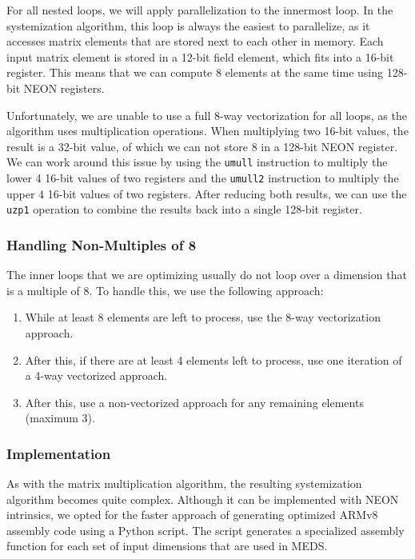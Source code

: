 \documentclass[11pt,a4paper]{report}
\theoremstyle{definition}
\begin{document}
For all nested loops, we will apply parallelization to the innermost loop. In the systemization algorithm, this loop is always the easiest to parallelize, as it accesses matrix elements that are stored next to each other in memory. Each input matrix element is stored in a 12-bit field element, which fits into a 16-bit register. This means that we can compute 8 elements at the same time using 128-bit NEON registers.

Unfortunately, we are unable to use a full 8-way vectorization for all loops, as the algorithm uses multiplication operations. When multiplying two 16-bit values, the result is a 32-bit value, of which we can not store 8 in a 128-bit NEON register. We can work around this issue by using the \texttt{umull} instruction to multiply the lower 4 16-bit values of two registers and the \texttt{umull2} instruction to multiply the upper 4 16-bit values of two registers. After reducing both results, we can use the \texttt{uzp1} operation to combine the results back into a single 128-bit register.

\subsubsection{Handling Non-Multiples of 8}
\label{sec:matrixsystemizationnonmultiples}
The inner loops that we are optimizing usually do not loop over a dimension that is a multiple of 8. To handle this, we use the following approach:
\begin{enumerate}
  \item While at least 8 elements are left to process, use the 8-way vectorization approach.
  \item After this, if there are at least 4 elements left to process, use one iteration of a 4-way vectorized approach.
  \item After this, use a non-vectorized approach for any remaining elements (maximum 3).
\end{enumerate}

\subsubsection{Implementation}
As with the matrix multiplication algorithm, the resulting systemization algorithm becomes quite complex. Although it can be implemented with NEON intrinsics, we opted for the faster approach of generating optimized ARMv8 assembly code using a Python script. The script generates a specialized assembly function for each set of input dimensions that are used in MEDS.
\end{document}
